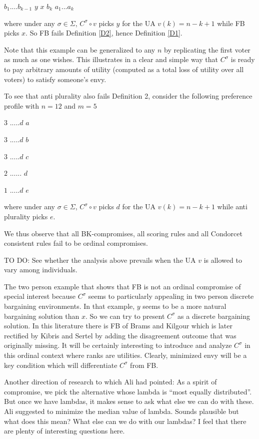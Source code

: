 \documentclass[12pt,notitlepage,a4paper]{article}
\begin{document}
$b_{1}....b_{k-1}$ $y$ $x$ $b_{k}$ $a_{1}...a_{k}$

\bigskip

where under any $\sigma \in \Sigma $, $C^{\sigma }\circ v$ picks $y$ for the
UA $v(k)=n-k+1$ while FB picks $x$. So FB fails Definition \ref{D2}, hence
Definition \ref{D1}.

Note that this example can be generalized to any $n$ by replicating the
first voter as much as one wishes. This illustrates in a clear and simple
way that $C^{\sigma }$ is ready to pay arbitrary amounts of utility
(computed as a total loss of utility over all voters) to satisfy someone's
envy.

To see that anti plurality also fails Definition 2, consider the following
preference profile with $n=12$ and $m=5$

$3$ $.....d$ $a$

$3$ $.....d$ $b$

$3$ $.....d$ $c$

$2$ $......$ $d$

$1$ $.....d$ $e$

\bigskip

where under any $\sigma \in \Sigma $, $C^{\sigma }\circ v$ picks $d$ for the
UA $v(k)=n-k+1$ while anti plurality picks $e$.

We thus observe that all BK-compromises, all scoring rules and all Condorcet
consistent rules fail to be ordinal compromises.

TO DO: See whether the analysis above prevails when the UA $v$ is allowed to
vary among individuals.

The two person example that shows that FB is not an ordinal compromise of
special interest because $C^{\sigma }$ seems to particularly appealing in
two person discrete bargaining environments. In that example, $y$ seems to
be a more natural bargaining solution than $x$. So we can try to present $%
C^{\sigma }$ as a discrete bargaining solution. In this literature there is
FB of Brams and Kilgour which is later rectified by Kibris and Sertel by
adding the disagreement outcome that was originally missing. It will be
certainly interesting to introduce and analyze $C^{\sigma }$ in this ordinal
context where ranks are utilities. Clearly, minimized envy will be a key
condition which will differentiate $C^{\sigma }$ from FB.

Another direction of research to which Ali had pointed: As a spirit of
compromise, we pick the alternative whose lambda is \textquotedblleft most
equally distributed\textquotedblright . But once we have lambdas, it makes
sense to ask what else we can do with these. Ali suggested to minimize the
median value of lambda. Sounds plausible but what does this mean? What else
can we do with our lambdas? I feel that there are plenty of interesting
questions here.

\bigskip
\end{document}
